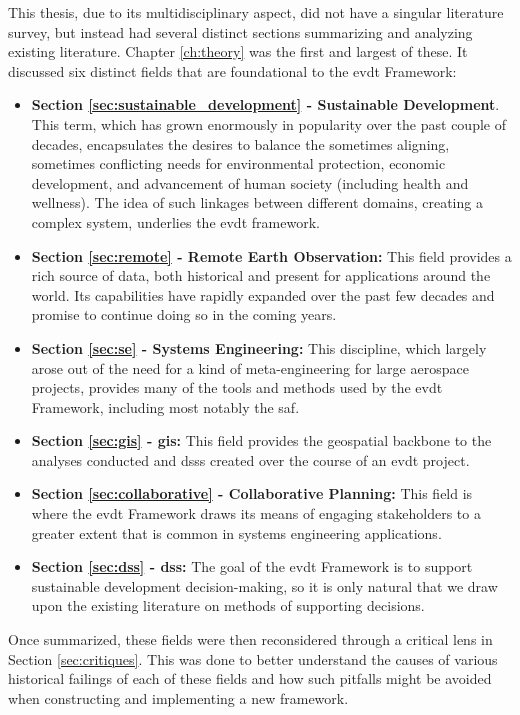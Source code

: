 This thesis, due to its multidisciplinary aspect, did not have a singular literature survey, but instead had several distinct sections summarizing and analyzing existing literature. Chapter \ref{ch:theory} was the first and largest of these. It discussed six distinct fields that are foundational to the \ac{evdt} Framework:

\begin{itemize}[itemsep=0pt,parsep=0pt]
	\item{\textbf{Section \ref{sec:sustainable_development} - Sustainable Development}. This term, which has grown enormously in popularity over the past couple of decades, encapsulates the desires to balance the sometimes aligning, sometimes conflicting needs for environmental protection, economic development, and advancement of human society (including health and wellness). The idea of such linkages between different domains, creating a complex system, underlies the \ac{evdt} framework.}
	\item{\textbf{Section \ref{sec:remote} - Remote Earth Observation:} This field provides a rich source of data, both historical and present for applications around the world. Its capabilities have rapidly expanded over the past few decades and promise to continue doing so in the coming years.}
	\item{\textbf{Section \ref{sec:se} - Systems Engineering:} This discipline, which largely arose out of the need for a kind of meta-engineering for large aerospace projects, provides many of the tools and methods used by the \ac{evdt} Framework, including most notably the \acf{saf}.}
	\item{\textbf{Section \ref{sec:gis} - \Acf{gis}:} This field provides the geospatial backbone to the analyses conducted and \acp{dss} created over the course of an \ac{evdt} project.} 
	\item{\textbf{Section \ref{sec:collaborative} - Collaborative Planning:} This field is where the \ac{evdt} Framework draws its means of engaging stakeholders to a greater extent that is common in systems engineering applications.}
	\item{\textbf{Section \ref{sec:dss} - \Acf{dss}:} The goal of the \ac{evdt} Framework is to support sustainable development decision-making, so it is only natural that we draw upon the existing literature on methods of supporting decisions.}
\end{itemize}

Once summarized, these fields were then reconsidered through a critical lens in Section \ref{sec:critiques}. This was done to better understand the causes of various historical failings of each of these fields and how such pitfalls might be avoided when constructing and implementing a new framework. 

